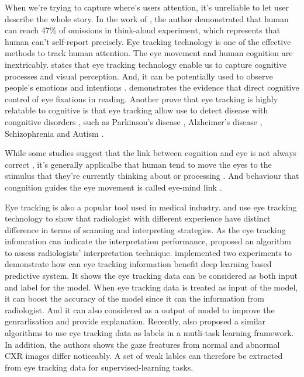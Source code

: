 When we're trying to capture where's users attention, it's unreliable to let user describe the whole story. In the work of \citet{Guan2006ThinkAloud}, the author demonstrated that human can reach 47\% of omissions in think-aloud experiment, which represents that human can't self-report precisely. Eye tracking technology is one of the effective methods to track human attention. The eye movement and human cognition are inextricably. \citep{Schall2014EyeTrackingIntro} states that eye tracking technology enable us to capture cognitive processes and visual perception. And, it can be potentially used to observe people's emotions and intentions \citep{Harezlak2018EyeTrackingInMedicine}. \citet{Rayner2015EvidenceCongnitiveFixation} demonstrates the evidence that direct cognitive control of eye fixations in reading. Another prove that eye tracking is highly relatable to cognitive is that eye tracking allow use to detect disease with congnitive disorders \citep{Harezlak2018EyeTrackingInMedicine}, such as Parkinson's disease \citep{S2016Parkinson}, Alzheimer's disease \citep{Crawford2015Alzheimer},
Schizophrenia \citep{Levy2010Schizophrenia} and Autism \citep{Belen2021Autism}.


While some studies suggest that the link between cognition and eye is not always correct \citep{Anderson2004EyeMovementNegativeSupport, Schall2014EyeTrackingIntro}, it's generally applicalbe that human tend to move the eyes to the stimulus that they're currently thinking about or processing \citep{Cater2020BestPracticeEyeTracking}. And behaviour that congnition guides the eye movement is called eye-mind link \citep{Reichle2012EyeMindLink1, Reichle2010EyeMindLink2}.

Eye tracking is also a popular tool used in medical industry. \citet{Manning2003ExpreienceRadiologist} and \citet{Nicholas2015PassingGlance} use eye tracking technology to show that radiologist with different experience have distinct difference in terms of scanning and interpreting strategies. As the eye tracking infomration can indicate the interpretation performance, \citep{McLaughlin2017EvaluateRadiologistPeformanceLevel} proposed an algorithm to assess radiologists' interpretation technique. \citet{Karargyris2021EyeGazePaper} implemented two experiments to demonstrate how can eye tracking information benefit deep learning based predictive system. It shows the eye tracking data can be considered as both input and label for the model. When eye tracking data is treated as input of the model, it can boost the accuracy of the model since it can the information from radiologist. And it can also considered as a output of model to improve the genrarlisation and provide explanation. Recently, \citep{Saab2021EyeTrackingCXRClassification} also proposed a similar algorithms to use eye tracking data as labels in a mutli-task learning framework. In addition, the authors shows the gaze freatures from normal and abnormal CXR images differ noticeably. A set of weak lables can therefore be extracted from eye tracking data for supervised-learning tasks.


